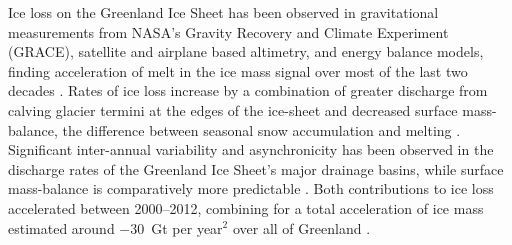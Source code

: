 \documentclass[11pt]{report}
\begin{document}
Ice loss on the Greenland Ice Sheet has been observed in
gravitational measurements from NASA's Gravity
Recovery and Climate Experiment (GRACE), satellite and airplane based
altimetry, and energy balance models, finding acceleration of melt in the ice mass signal over most of the last two decades \cite[][]{khan2015,Harig+2016}. Rates of ice loss increase by a
combination of greater discharge from calving glacier termini at the edges of
the ice-sheet and decreased surface mass-balance, the difference between
seasonal snow accumulation and melting \cite[][]{khan2015,enderlin2014}.
Significant inter-annual variability and asynchronicity has been observed in
the discharge rates of the Greenland Ice Sheet's major drainage basins, while
surface mass-balance is comparatively more predictable
\cite[][]{mcmillan2016,enderlin2014}. Both contributions to ice loss accelerated between 2000--2012, combining for a total acceleration of ice mass
estimated around $-30$~Gt per year$^2$ over all of Greenland
\cite[][]{velicogna2009,enderlin2014}.
\end{document}
